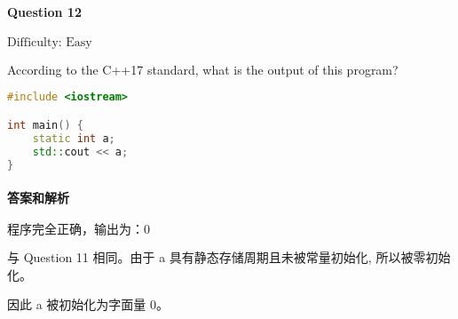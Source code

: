 \documentclass{article}
\begin{document}
	\paragraph*{Question 12}\noindent $\boxed{\text{Difficulty: Easy}} $
	
	According to the C++17 standard, what is the output of this program? 
	
	\begin{lstlisting}[language=C++]    
#include <iostream>

int main() {
	static int a;
	std::cout << a;
}
	\end{lstlisting}
	
	\paragraph*{答案和解析} $\boxed{\text{程序完全正确，输出为：0}} $
	
	与 Question 11 相同。由于 a 具有静态存储周期且未被常量初始化, 所以被零初始化。
	
	因此 a 被初始化为字面量 0。
	 
\end{document}
